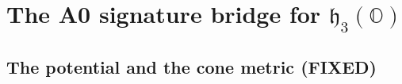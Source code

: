 %
%
%

\section{The A0 signature bridge for $\mathfrak{h}_3(\mathbb{O})$}

\subsection{The potential and the cone metric (FIXED)}

